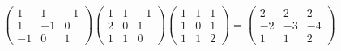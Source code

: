 \documentclass{exam}
\begin{document}
\begin{solution}
\begin{parts}
\[\begin{pmatrix}
          1 & 1 & -1 \\
          1 & -1 & 0 \\
          -1 & 0 & 1
        \end{pmatrix}
        \begin{pmatrix}
          1 & 1 & -1 \\
          2 & 0 & 1 \\
          1 & 1 & 0
        \end{pmatrix}
        \begin{pmatrix}
          1 & 1 & 1 \\
          1 & 0 & 1 \\
          1 & 1 & 2
        \end{pmatrix}
        = \boxed{
          \begin{pmatrix}
            2 & 2 & 2 \\
            -2 & -3 & -4 \\
            1 & 1 & 2
          \end{pmatrix}
        }
      \]
    \end{parts}
  \end{solution}

  \newpage 
\end{document}
